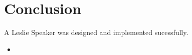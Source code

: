 \chapter{Conclusion}

A Leslie Speaker was designed and implemented sucessfully.

\begin{itemize}
	\item
\end{itemize}




